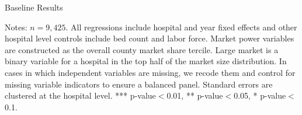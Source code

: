 \documentclass[12pt]{article}
\begin{document}
\setlength{\captionmargin}{.5 \textwidth} \addtolength{\captionmargin}{-.5\wd\gfxbox}
\begin{table}[!h]
\centering
\caption{Baseline Results}
\label{tab:baselineresults}
\usebox{\gfxbox}
\par
\begin{minipage}{\wd\gfxbox}
\footnotesize
Notes: $n=9,425$.  All regressions include hospital and year fixed effects and other hospital level controls include bed count and labor force.  Market power variables are constructed as the overall county market share tercile.  Large market is a binary variable for a hospital in the top half of the market size distribution.  In cases in which independent variables are missing, we recode them and control for missing variable indicators to ensure a balanced panel.  Standard errors are clustered at the hospital level.  *** p-value$<$0.01, ** p-value$<$0.05, * p-value$<$0.1.
\end{minipage}
\end{table}
\end{document}
